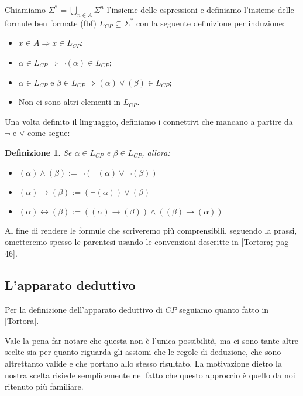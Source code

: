\documentclass[a4paper, 12pt]{article}
\newtheorem{definition}{Definizione}
\begin{document}
Chiamiamo $\Sigma^{*} = \bigcup_{n \in A} \Sigma^n$ l'insieme delle espressioni
e definiamo l'insieme delle formule ben formate (fbf) $L_{CP} \subseteq \Sigma^{*}$ con la seguente definizione
per induzione:
\begin{itemize}
\item $x \in A \Rightarrow x \in L_{CP}$;
\item $\alpha \in L_{CP} \Rightarrow \neg (\alpha) \in L_{CP}$;
\item $\alpha \in L_{CP}$ e $\beta \in L_{CP} \Rightarrow (\alpha) \lor (\beta) \in L_{CP}$;
\item Non ci sono altri elementi in $L_{CP}$.
\end{itemize}

Una volta definito il linguaggio, definiamo i connettivi che mancano a partire da $\neg$ e $\lor$
come segue:
\begin{definition}
Se $\alpha \in L_{CP}$ e $\beta \in L_{CP}$, allora:
\begin{itemize}
\item $(\alpha) \land (\beta) := \neg(\neg(\alpha) \lor \neg(\beta))$
\item $(\alpha) \rightarrow (\beta) := (\neg(\alpha)) \lor (\beta)$
\item $(\alpha) \leftrightarrow (\beta) := ((\alpha) \rightarrow (\beta)) \land ((\beta) \rightarrow (\alpha))$
\end{itemize}
\end{definition}

Al fine di rendere le formule che scriveremo più comprensibili, seguendo la prassi,
ometteremo spesso le parentesi usando le convenzioni descritte in [Tortora; pag 46].

\subsection{L'apparato deduttivo}
Per la definizione dell'apparato deduttivo di $CP$ seguiamo quanto fatto in [Tortora].

Vale la pena far notare che questa non è l'unica possibilità, ma ci sono tante altre scelte sia
per quanto riguarda gli assiomi che le regole di deduzione, che sono altrettanto valide
e che portano allo stesso risultato. La motivazione dietro la nostra scelta
risiede semplicemente nel fatto che questo approccio è quello da noi ritenuto più familiare.
\end{document}
